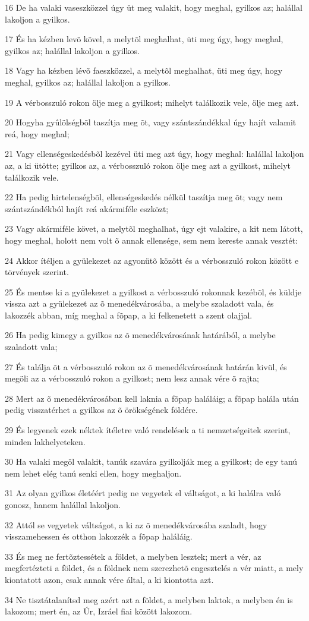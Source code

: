 \par 16 De ha valaki vaseszközzel úgy üt meg valakit, hogy meghal, gyilkos az; halállal lakoljon a gyilkos.
\par 17 És ha kézben levõ kõvel, a melytõl meghalhat, üti meg úgy, hogy meghal, gyilkos az; halállal lakoljon a gyilkos.
\par 18 Vagy ha kézben lévõ faeszközzel, a melytõl meghalhat, üti meg úgy, hogy meghal, gyilkos az; halállal lakoljon a gyilkos.
\par 19 A vérbosszuló rokon ölje meg a gyilkost; mihelyt találkozik vele, ölje meg azt.
\par 20 Hogyha gyûlölségbõl taszítja meg õt, vagy szántszándékkal úgy hajít valamit reá, hogy meghal;
\par 21 Vagy ellenségeskedésbõl kezével üti meg azt úgy, hogy meghal: halállal lakoljon az, a ki ütötte; gyilkos az, a vérbosszuló rokon ölje meg azt a gyilkost, mihelyt találkozik vele.
\par 22 Ha pedig hirtelenségbõl, ellenségeskedés nélkül taszítja meg õt; vagy nem szántszándékból hajít reá akármiféle eszközt;
\par 23 Vagy akármiféle követ, a melytõl meghalhat, úgy ejt valakire, a kit nem látott, hogy meghal, holott nem volt õ annak ellensége, sem nem kereste annak vesztét:
\par 24 Akkor ítéljen a gyülekezet az agyonütõ között és a vérbosszuló rokon között e törvények szerint.
\par 25 És mentse ki a gyülekezet a gyilkost a vérbosszuló rokonnak kezébõl, és küldje vissza azt a gyülekezet az õ menedékvárosába, a melybe szaladott vala, és lakozzék abban, míg meghal a fõpap, a ki felkenetett a szent olajjal.
\par 26 Ha pedig kimegy a gyilkos az õ menedékvárosának határából, a melybe szaladott vala;
\par 27 És találja õt a vérbosszuló rokon az õ menedékvárosának határán kivül, és megöli az a vérbosszuló rokon a gyilkost; nem lesz annak vére õ rajta;
\par 28 Mert az õ menedékvárosában kell laknia a fõpap haláláig; a fõpap halála után pedig visszatérhet a gyilkos az õ örökségének földére.
\par 29 És legyenek ezek néktek ítéletre való rendelések a ti nemzetségeitek szerint, minden lakhelyeteken.
\par 30 Ha valaki megöl valakit, tanúk szavára gyilkolják meg a gyilkost; de egy tanú nem lehet elég tanú senki ellen, hogy meghaljon.
\par 31 Az olyan gyilkos életéért pedig ne vegyetek el váltságot, a ki halálra való gonosz, hanem halállal lakoljon.
\par 32 Attól se vegyetek váltságot, a ki az õ menedékvárosába szaladt, hogy visszamehessen és otthon lakozzék a fõpap haláláig.
\par 33 És meg ne fertõztessétek a földet, a melyben lesztek; mert a vér, az megfertézteti a földet, és a földnek nem szerezhetõ engesztelés a vér miatt, a mely kiontatott azon, csak annak vére által, a ki kiontotta azt.
\par 34 Ne tisztátalanítsd meg azért azt a földet, a melyben laktok, a melyben én is lakozom; mert én, az Úr, Izráel fiai között lakozom.

